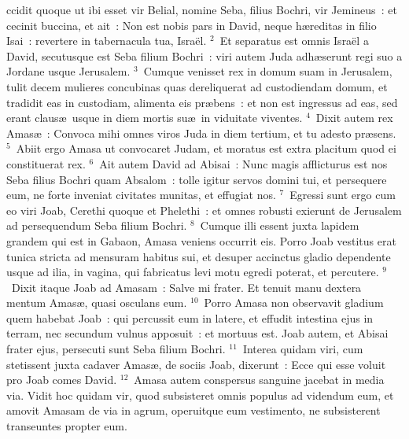 \bchapter
{}ccidit quoque ut ibi esset vir Belial, nomine Seba, filius Bochri, vir Jemineus~: et cecinit buccina, et ait~: Non est nobis pars in David, neque h\ae reditas in filio Isai~: revertere in tabernacula tua, Isra\"el.
${}^{2}$~Et separatus est omnis Isra\"el a David, secutusque est Seba filium Bochri~: viri autem Juda adh\ae serunt regi suo a Jordane usque Jerusalem.
${}^{3}$~Cumque venisset rex in domum suam in Jerusalem, tulit decem mulieres concubinas quas dereliquerat ad custodiendam domum, et tradidit eas in custodiam, alimenta eis pr\ae bens~: et non est ingressus ad eas, sed erant claus\ae\ usque in diem mortis su\ae\ in viduitate viventes.
${}^{4}$~Dixit autem rex Amas\ae~: Convoca mihi omnes viros Juda in diem tertium, et tu adesto pr\ae sens.
${}^{5}$~Abiit ergo Amasa ut convocaret Judam, et moratus est extra placitum quod ei constituerat rex.
${}^{6}$~Ait autem David ad Abisai~: Nunc magis afflicturus est nos Seba filius Bochri quam Absalom~: tolle igitur servos domini tui, et persequere eum, ne forte inveniat civitates munitas, et effugiat nos.
${}^{7}$~Egressi sunt ergo cum eo viri Joab, Cerethi quoque et Phelethi~: et omnes robusti exierunt de Jerusalem ad persequendum Seba filium Bochri.
${}^{8}$~Cumque illi essent juxta lapidem grandem qui est in Gabaon, Amasa veniens occurrit eis. Porro Joab vestitus erat tunica stricta ad mensuram habitus sui, et desuper accinctus gladio dependente usque ad ilia, in vagina, qui fabricatus levi motu egredi poterat, et percutere.
${}^{9}$~Dixit itaque Joab ad Amasam~: Salve mi frater. Et tenuit manu dextera mentum Amas\ae , quasi osculans eum.
${}^{10}$~Porro Amasa non observavit gladium quem habebat Joab~: qui percussit eum in latere, et effudit intestina ejus in terram, nec secundum vulnus apposuit~: et mortuus est. Joab autem, et Abisai frater ejus, persecuti sunt Seba filium Bochri.
${}^{11}$~Interea quidam viri, cum stetissent juxta cadaver Amas\ae , de sociis Joab, dixerunt~: Ecce qui esse voluit pro Joab comes David.
${}^{12}$~Amasa autem conspersus sanguine jacebat in media via. Vidit hoc quidam vir, quod subsisteret omnis populus ad videndum eum, et amovit Amasam de via in agrum, operuitque eum vestimento, ne subsisterent transeuntes propter eum.



